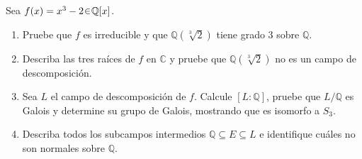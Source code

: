 \begin{ejer}
Sea $f(x) = x^3 - 2 \en \mathbb{Q}[x]$.

\begin{enumerate}[label=\alph*)]
\item Pruebe que $f$ es irreducible y que $\mathbb{Q}(\sqrt[3]{2})$ tiene grado 3 sobre $\mathbb{Q}$.

\item Describa las tres raíces de $f$ en $\mathbb{C}$ y pruebe que $\mathbb{Q}(\sqrt[3]{2})$ no es un campo de descomposición.

\item Sea $L$ el campo de descomposición de $f$. Calcule $[L : \mathbb{Q}]$, pruebe que $L/\mathbb{Q}$ es Galois y determine su grupo de Galois, mostrando que es isomorfo a $S_3$.

\item Describa todos los subcampos intermedios $\mathbb{Q} \subseteq E \subseteq L$ e identifique cuáles no son normales sobre $\mathbb{Q}$.
\end{enumerate}
\end{ejer}
